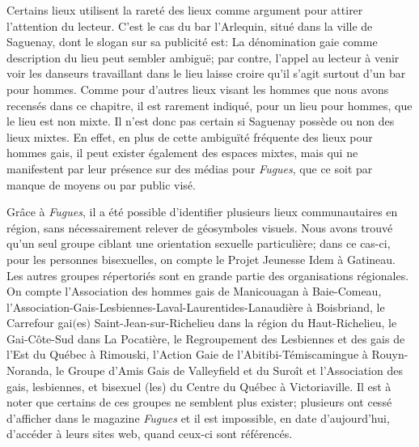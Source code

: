 Certains lieux utilisent la rareté des lieux \lgbt{} comme argument pour attirer l'attention du lecteur.
C'est le cas du bar l'Arlequin, situé dans la ville de Saguenay, dont le slogan sur sa publicité est: 
La dénomination gaie comme description du lieu peut sembler ambiguë; par contre, l'appel au lecteur à venir voir les danseurs travaillant dans le lieu laisse croire qu'il s'agit surtout d'un bar pour hommes.
Comme pour d'autres lieux visant les hommes que nous avons recensés dans ce chapitre, il est rarement indiqué, pour un lieu pour hommes, que le lieu est non mixte.
Il n'est donc pas certain si Saguenay possède ou non des lieux mixtes.
En effet, en plus de cette ambiguïté fréquente des lieux pour hommes gais, il peut exister également des espaces mixtes, mais qui ne manifestent par leur présence sur des médias pour \emph{Fugues}, que ce soit par manque de moyens ou par public visé.

Grâce à \emph{Fugues}, il a été possible d'identifier plusieurs lieux communautaires en région, sans nécessairement relever de géosymboles visuels.
Nous avons trouvé qu'un seul groupe ciblant une orientation sexuelle particulière; dans ce cas-ci, pour les personnes bisexuelles, on compte le Projet Jeunesse Idem à Gatineau.
Les autres groupes répertoriés sont en grande partie des organisations régionales.
On compte l'Association des hommes gais de Manicouagan à Baie-Comeau, l'Association-Gais-Lesbiennes-Laval-Laurentides-Lanaudière à Boisbriand, le Carrefour gai$($es$)$ Saint-Jean-sur-Richelieu dans la région du Haut-Richelieu, le Gai-Côte-Sud dans La Pocatière, le Regroupement des Lesbiennes et des gais de l'Est du Québec à Rimouski, l'Action Gaie de l'Abitibi-Témiscamingue à Rouyn-Noranda, le Groupe d'Amis Gais de Valleyfield et du Suroît et l'Association des gais, lesbiennes, et bisexuel (les) du Centre du Québec à Victoriaville.
Il est à noter que certains de ces groupes ne semblent plus exister; plusieurs ont cessé d'afficher dans le magazine \emph{Fugues} et il est impossible, en date d'aujourd'hui, d'accéder à leurs sites web, quand ceux-ci sont référencés.

